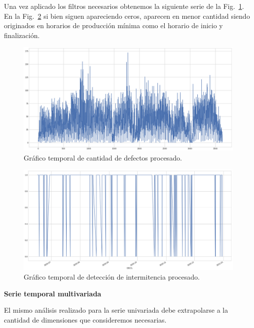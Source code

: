 \documentclass[a4paper,12pt]{article}
\begin{document}
		
		
		Una vez aplicado los filtros necesarios obtenemos la siguiente serie de la Fig.~\ref{fig:graf_cantdef_desp}. En la Fig.~\ref{fig:graf_inter_desp} si bien siguen apareciendo ceros, aparecen en menor cantidad siendo originados en horarios de producción mínima como el horario de inicio y finalización.
		
		\begin{figure}[H]
			\begin{center}
				\includegraphics[width=1\textwidth]{tesis_80.png}
				\caption{Gráfico temporal de cantidad de defectos procesado.}
				\label{fig:graf_cantdef_desp}
			\end{center}
		\end{figure}
		
		\begin{figure}[H]
			\begin{center}
				\includegraphics[width=1\textwidth]{tesis_81.png}
				\caption{Gráfico temporal de detección de intermitencia  procesado.}
				\label{fig:graf_inter_desp}
			\end{center}
		\end{figure}
		
		\textbf{Serie temporal multivariada}
		
		El mismo análisis realizado para la serie univariada debe extrapolarse a la cantidad de dimensiones que consideremos necesarias. 
		
\end{document}
